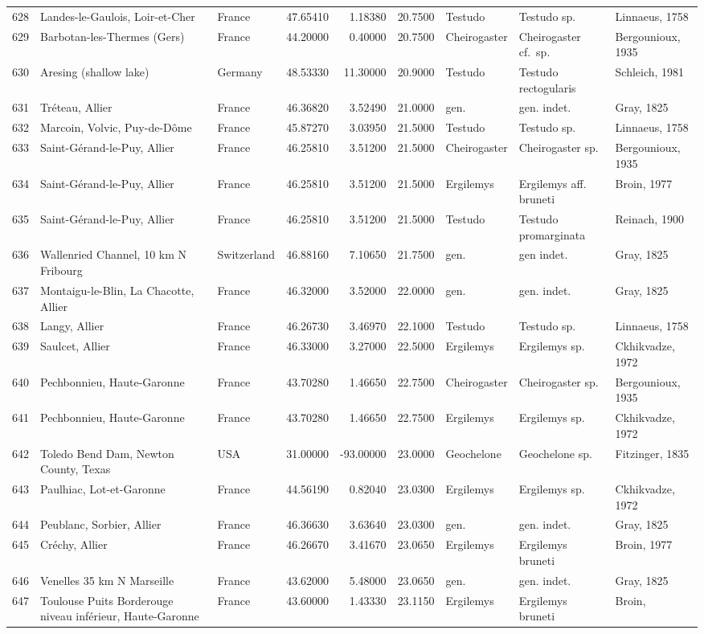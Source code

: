 \documentclass[]{article}
\begin{document}
\begin{longtable}[]{@{}lllrrrlll@{}}
628 & Landes-le-Gaulois, Loir-et-Cher & France & 47.65410 & 1.18380 &
20.7500 & Testudo & Testudo sp. & Linnaeus, 1758\tabularnewline
629 & Barbotan-les-Thermes (Gers) & France & 44.20000 & 0.40000 &
20.7500 & Cheirogaster & Cheirogaster cf.~sp. & Bergounioux,
1935\tabularnewline
630 & Aresing (shallow lake) & Germany & 48.53330 & 11.30000 & 20.9000 &
Testudo & Testudo rectogularis & Schleich, 1981\tabularnewline
631 & Tréteau, Allier & France & 46.36820 & 3.52490 & 21.0000 & gen. &
gen. indet. & Gray, 1825\tabularnewline
632 & Marcoin, Volvic, Puy-de-Dôme & France & 45.87270 & 3.03950 &
21.5000 & Testudo & Testudo sp. & Linnaeus, 1758\tabularnewline
633 & Saint-Gérand-le-Puy, Allier & France & 46.25810 & 3.51200 &
21.5000 & Cheirogaster & Cheirogaster sp. & Bergounioux,
1935\tabularnewline
634 & Saint-Gérand-le-Puy, Allier & France & 46.25810 & 3.51200 &
21.5000 & Ergilemys & Ergilemys aff. bruneti & Broin,
1977\tabularnewline
635 & Saint-Gérand-le-Puy, Allier & France & 46.25810 & 3.51200 &
21.5000 & Testudo & Testudo promarginata & Reinach, 1900\tabularnewline
636 & Wallenried Channel, 10 km N Fribourg & Switzerland & 46.88160 &
7.10650 & 21.7500 & gen. & gen indet. & Gray, 1825\tabularnewline
637 & Montaigu-le-Blin, La Chacotte, Allier & France & 46.32000 &
3.52000 & 22.0000 & gen. & gen. indet. & Gray, 1825\tabularnewline
638 & Langy, Allier & France & 46.26730 & 3.46970 & 22.1000 & Testudo &
Testudo sp. & Linnaeus, 1758\tabularnewline
639 & Saulcet, Allier & France & 46.33000 & 3.27000 & 22.5000 &
Ergilemys & Ergilemys sp. & Ckhikvadze, 1972\tabularnewline
640 & Pechbonnieu, Haute-Garonne & France & 43.70280 & 1.46650 & 22.7500
& Cheirogaster & Cheirogaster sp. & Bergounioux, 1935\tabularnewline
641 & Pechbonnieu, Haute-Garonne & France & 43.70280 & 1.46650 & 22.7500
& Ergilemys & Ergilemys sp. & Ckhikvadze, 1972\tabularnewline
642 & Toledo Bend Dam, Newton County, Texas & USA & 31.00000 & -93.00000
& 23.0000 & Geochelone & Geochelone sp. & Fitzinger, 1835\tabularnewline
643 & Paulhiac, Lot-et-Garonne & France & 44.56190 & 0.82040 & 23.0300 &
Ergilemys & Ergilemys sp. & Ckhikvadze, 1972\tabularnewline
644 & Peublanc, Sorbier, Allier & France & 46.36630 & 3.63640 & 23.0300
& gen. & gen. indet. & Gray, 1825\tabularnewline
645 & Créchy, Allier & France & 46.26670 & 3.41670 & 23.0650 & Ergilemys
& Ergilemys bruneti & Broin, 1977\tabularnewline
646 & Venelles 35 km N Marseille & France & 43.62000 & 5.48000 & 23.0650
& gen. & gen. indet. & Gray, 1825\tabularnewline
647 & Toulouse Puits Borderouge niveau inférieur, Haute-Garonne & France
& 43.60000 & 1.43330 & 23.1150 & Ergilemys & Ergilemys bruneti & Broin,

\end{longtable}
\end{document}
